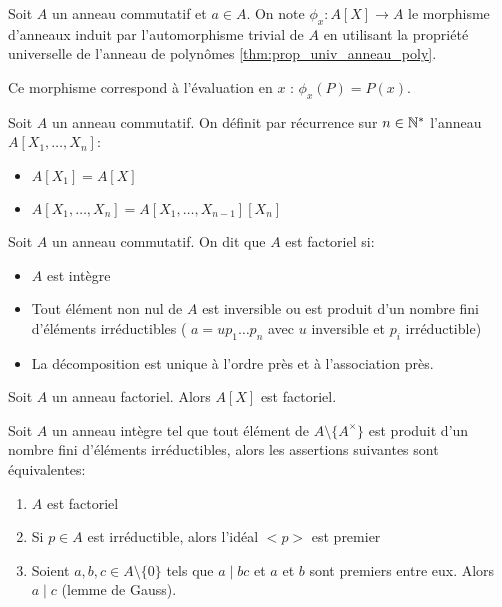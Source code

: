 \begin{definition}[Evaluation]
	Soit $A$ un anneau commutatif et $a \in A$. On note $\phi_x: A[X] \to A$ le morphisme d'anneaux
	induit par l'automorphisme trivial de $A$ en utilisant la propriété universelle de l'anneau de polynômes \ref{thm:prop_univ_anneau_poly}.

	Ce morphisme correspond à l'évaluation en $x$ : $\phi_x(P) = P(x)$.

\end{definition}

\begin{definition}
	Soit $A$ un anneau commutatif. On définit par récurrence sur $n \in \mathbb{N}^*$ l'anneau $A[X_1, \dots, X_n]$:
	\begin{itemize}
		\item $A[X_1] = A[X]$
		\item $A[X_1, \dots, X_n] = A[X_1, \dots, X_{n-1}][X_n]$
	\end{itemize}
\end{definition}


\begin{definition}
	Soit $A$ un anneau commutatif. On dit que $A$ est factoriel si:
	\begin{itemize}
		\item $A$ est intègre
		\item Tout élément non nul de $A$ est inversible ou est produit d'un nombre fini
		      d'éléments irréductibles ( $a = u p_1 \dots p_n$ avec $u$ inversible et $p_i$ irréductible)
		\item La décomposition est unique à l'ordre près et à l'association près.
	\end{itemize}
\end{definition}

\begin{prop}[Admis]
	Soit $A$ un anneau factoriel. Alors $A[X]$ est factoriel.
\end{prop}


\begin{prop}
	Soit $A$ un anneau intègre tel que tout élément de $A\setminus\{A^{\times}\}$ est produit d'un nombre fini d'éléments irréductibles, alors les assertions suivantes sont équivalentes:
	\begin{enumerate}
		\item $A$ est factoriel
		\item Si $p \in A$ est irréductible, alors l'idéal $<p>$ est premier
		\item Soient $a,b,c \in A\setminus\{0\}$ tels que $a \mid bc$ et $a$ et $b$ sont premiers entre eux. Alors $a \mid c$ (lemme de Gauss).
	\end{enumerate}
\end{prop}

